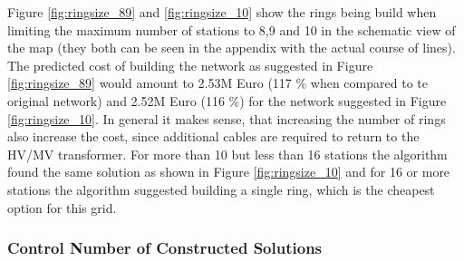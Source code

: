 
Figure \ref{fig:ringsize_89} and \ref{fig:ringsize_10} show the rings being build when limiting the maximum number of stations to 8,9 and 10 in the schematic view of the map (they both can be seen in the appendix with the actual course of lines). The predicted cost of building the network as suggested in Figure \ref{fig:ringsize_89} would amount to 2.53M Euro (117 \% when compared to te original network) and 2.52M Euro (116 \%) for the network suggested in Figure \ref{fig:ringsize_10}. In general it makes sense, that increasing the number of rings also increase the cost, since additional cables are required to return to the HV/MV transformer. For more than 10 but less than 16 stations the algorithm found the same solution as shown in Figure \ref{fig:ringsize_10} and for 16 or more stations the algorithm suggested building a single ring, which is the cheapest option for this grid.

%
%
%
%

\subsubsection{Control Number of Constructed Solutions}\label{constructed_solutions}

